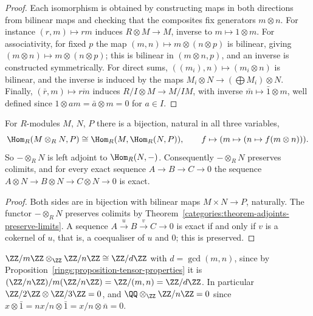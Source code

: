 \begin{proof}
Each isomorphism is obtained by constructing maps in both directions from bilinear
maps and checking that the composites fix generators $m \otimes n$. For instance
$(r, m) \mapsto rm$ induces $R \otimes M \to M$, inverse to $m \mapsto 1 \otimes m$. For
associativity, for fixed $p$ the map $(m, n) \mapsto m \otimes (n \otimes p)$ is bilinear, giving
$(m \otimes n) \mapsto m \otimes (n \otimes p)$; this is bilinear in $(m \otimes n, p)$, and an inverse
is constructed symmetrically. For direct sums, $((m_i), n) \mapsto (m_i \otimes n)$ is bilinear,
and the inverse is induced by the maps $M_i \otimes N \to (\bigoplus M_i) \otimes N$. Finally,
$(\bar r, m) \mapsto \overline{rm}$ induces $R/I \otimes M \to M/IM$, with inverse
$\bar m \mapsto \bar 1 \otimes m$, well defined since $1 \otimes am = \bar a \otimes m = 0$ for $a \in I$.
\end{proof}

\begin{theorem}\label{rings:theorem-tensor-hom}
For $R$-modules $M$, $N$, $P$ there is a bijection, natural in all three variables,
\[
\Hom_R(M \otimes_R N, P) \cong \Hom_R(M, \Hom_R(N, P)), \qquad f \mapsto (m \mapsto (n \mapsto f(m \otimes n))).
\]
So $- \otimes_R N$ is left adjoint to $\Hom_R(N, -)$. Consequently $- \otimes_R N$ preserves
colimits, and for every exact sequence $A \to B \to C \to 0$ the sequence
$A \otimes N \to B \otimes N \to C \otimes N \to 0$ is exact.
\end{theorem}

\begin{proof}
Both sides are in bijection with bilinear maps $M \times N \to P$, naturally. The functor
$- \otimes_R N$ preserves colimits by Theorem~\ref{categories:theorem-adjoints-preserve-limits}.
A sequence $A \xrightarrow{u} B \xrightarrow{v} C \to 0$ is exact if and only if $v$ is a cokernel of $u$,
that is, a coequaliser of $u$ and $0$; this is preserved.
\end{proof}

\begin{example}\label{rings:example-tensor-cyclic}
$\ZZ/m\ZZ \otimes_\ZZ \ZZ/n\ZZ \cong \ZZ/d\ZZ$ with $d = \gcd(m, n)$, since by
Proposition~\ref{rings:proposition-tensor-properties} it is
$(\ZZ/n\ZZ)/m(\ZZ/n\ZZ) = \ZZ/(m, n) = \ZZ/d\ZZ$. In particular
$\ZZ/2\ZZ \otimes \ZZ/3\ZZ = 0$, and $\QQ \otimes_\ZZ \ZZ/n\ZZ = 0$ since $x \otimes \bar 1 = nx/n \otimes \bar 1 = x/n \otimes \bar n = 0$.
\end{example}

